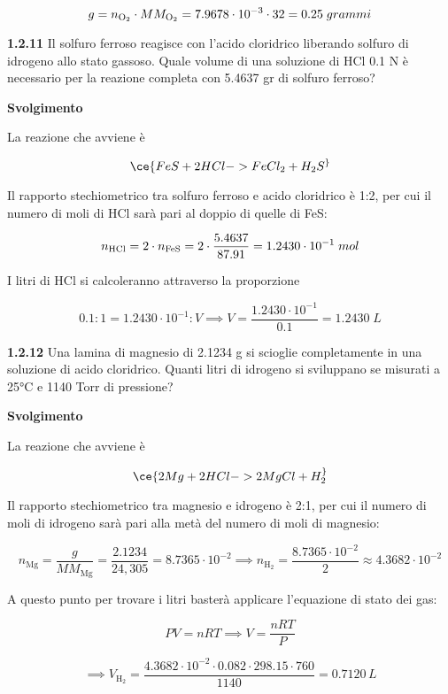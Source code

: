 $$g=n_{\rm O_2} \cdot MM_{\rm O_2}
=7.9678 \cdot 10^{-3} \cdot 32=0.25\;grammi$$

\vspace{0.2cm}\textbf{1.2.11} Il solfuro ferroso reagisce con l'acido cloridrico liberando solfuro di idrogeno allo stato gassoso. Quale volume di una soluzione di HCl 0.1 N è necessario per la reazione completa con 5.4637 gr di solfuro ferroso?

\vspace{0.2cm}\large\textbf{Svolgimento}\normalsize

\vspace{0.2cm}La reazione che avviene è

$$\ce{FeS + 2HCl -> FeCl_2 + H_2S ^}$$

Il rapporto stechiometrico tra solfuro ferroso e acido cloridrico è 1:2, per cui il numero di moli di HCl sarà pari al doppio di quelle di FeS:

$$n_{\rm HCl}=2 \cdot n_{\rm FeS}=2 \cdot \frac{5.4637}{87.91}=1.2430 \cdot 10^{-1}\;mol$$

I litri di HCl si calcoleranno attraverso la proporzione

$$0.1:1=1.2430 \cdot 10^{-1}:V
\implies
V=\frac{1.2430 \cdot 10^{-1}}{0.1}=1.2430\;L$$

\vspace{0.2cm}\textbf{1.2.12} Una lamina di magnesio di 2.1234 g si scioglie completamente in una soluzione di acido cloridrico. Quanti litri di idrogeno si sviluppano se misurati a 25°C e 1140 Torr di pressione?

\vspace{0.2cm}\large\textbf{Svolgimento}\normalsize

\vspace{0.2cm}La reazione che avviene è

$$\ce{2Mg + 2HCl -> 2MgCl + H_2 ^}$$

Il rapporto stechiometrico tra magnesio e idrogeno è 2:1, per cui il numero di moli di idrogeno sarà pari alla metà del numero di moli di magnesio:

$$n_{\text{Mg}}=\frac{g}{MM_{\text{Mg}}}=\frac{2.1234}{24,305}=8.7365 \cdot 10^{-2} \implies n_{\text{H}_2}=\frac{8.7365 \cdot 10^{-2}}{2}\approx 4.3682 \cdot 10^{-2}$$

A questo punto per trovare i litri basterà applicare l'equazione di stato dei gas:

$$PV=nRT \implies V=\frac{nRT}{P}$$

$$\implies V_{\text{H}_2}=\frac{4.3682 \cdot 10^{-2} \cdot 0.082 \cdot 298.15 \cdot 760}{1140}=0.7120\,L$$

